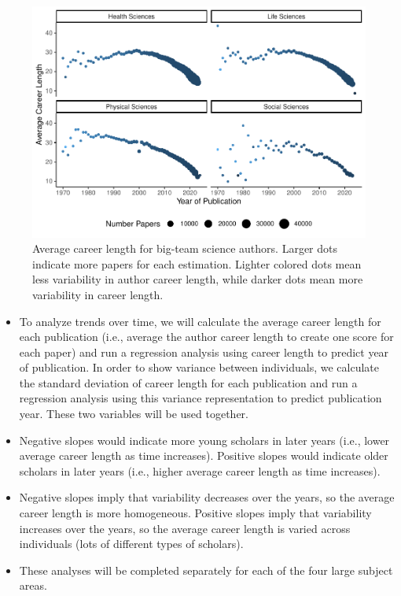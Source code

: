 \documentclass[
  man]{apa7}
\providecommand{\tightlist}{%
  \setlength{\itemsep}{0pt}\setlength{\parskip}{0pt}}
\begin{document}
\begin{figure}
\centering
\includegraphics{manuscript_scopus_files/figure-latex/fig-career-1.pdf}
\caption{\label{fig:fig-career}Average career length for big-team science authors. Larger dots indicate more papers for each estimation. Lighter colored dots mean less variability in author career length, while darker dots mean more variability in career length.}
\end{figure}

\begin{itemize}
\tightlist
\item
  To analyze trends over time, we will calculate the average career
  length for each publication (i.e., average the author career length
  to create one score for each paper) and run a regression analysis
  using career length to predict year of publication. In order to show
  variance between individuals, we calculate the standard deviation of
  career length for each publication and run a regression analysis
  using this variance representation to predict publication year.
  These two variables will be used together.
\item
  Negative slopes would indicate more young scholars in later years
  (i.e., lower average career length as time increases). Positive
  slopes would indicate older scholars in later years (i.e., higher
  average career length as time increases).
\item
  Negative slopes imply that variability decreases over the years, so
  the average career length is more homogeneous. Positive slopes imply
  that variability increases over the years, so the average career
  length is varied across individuals (lots of different types of
  scholars).
\item
  These analyses will be completed separately for each of the four
  large subject areas.
\end{itemize}
\end{document}
